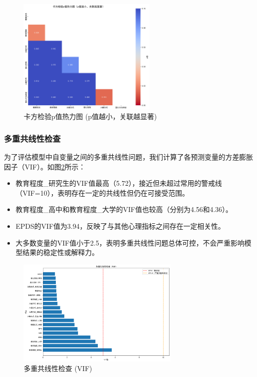 \documentclass[withoutpreface,bwprint]{cumcmthesis}
\begin{document}
\begin{figure}[htbp]
    \centering
    \includegraphics[width=0.6\textwidth]{figures/chi_square_p_values_heatmap.png}
    \caption{卡方检验p值热力图 (p值越小，关联越显著)}
    \label{fig:chi_square_p_values_heatmap}
\end{figure}

\subsubsection{多重共线性检查}
为了评估模型中自变量之间的多重共线性问题，我们计算了各预测变量的方差膨胀因子（VIF）。如图\ref{fig:multicollinearity_vif}所示：
\begin{itemize}
    \item 教育程度\_研究生的VIF值最高（5.72），接近但未超过常用的警戒线（VIF=10），表明存在一定的共线性但仍在可接受范围。
    \item 教育程度\_高中和教育程度\_大学的VIF值也较高（分别为4.56和4.36）。
    \item EPDS的VIF值为3.94，反映了与其他心理指标之间存在一定相关性。
    \item 大多数变量的VIF值小于2.5，表明多重共线性问题总体可控，不会严重影响模型结果的稳定性或解释力。
\end{itemize}

\begin{figure}[htbp]
    \centering
    \includegraphics[width=0.7\textwidth]{figures/multicollinearity_vif.png}
    \caption{多重共线性检查 (VIF)}
    \label{fig:multicollinearity_vif}
\end{figure}
\end{document}
